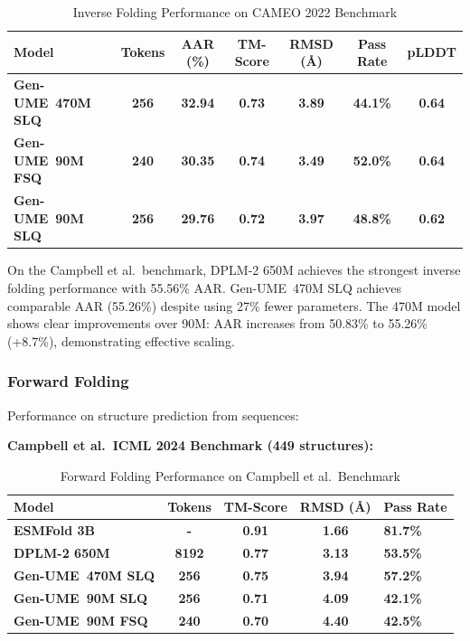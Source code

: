 \documentclass[11pt,a4paper]{article}
\newcommand{\genume}{Gen-UME}
\begin{document}
\begin{table}[h]
\centering
\small
\caption{Inverse Folding Performance on CAMEO 2022 Benchmark}
\begin{tabular}{@{}lcccccc@{}}
\toprule
\textbf{Model} & \textbf{Tokens} & \textbf{AAR (\%)} & \textbf{TM-Score} & \textbf{RMSD (Å)} & \textbf{Pass Rate} & \textbf{pLDDT} \\
\midrule
\textbf{\genume~470M SLQ} & \textbf{256} & \textbf{32.94} & \textbf{0.73} & \textbf{3.89} & \textbf{44.1\%} & \textbf{0.64} \\
\textbf{\genume~90M FSQ} & \textbf{240} & \textbf{30.35} & \textbf{0.74} & \textbf{3.49} & \textbf{52.0\%} & \textbf{0.64} \\
\textbf{\genume~90M SLQ} & \textbf{256} & \textbf{29.76} & \textbf{0.72} & \textbf{3.97} & \textbf{48.8\%} & \textbf{0.62} \\
\bottomrule
\end{tabular}
\label{tab:inverse_folding_cameo}
\end{table}

On the Campbell et al.~benchmark, DPLM-2 650M achieves the strongest inverse folding performance with 55.56\% AAR. \genume~470M SLQ achieves comparable AAR (55.26\%) despite using 27\% fewer parameters. The 470M model shows clear improvements over 90M: AAR increases from 50.83\% to 55.26\% (+8.7\%), demonstrating effective scaling.

\subsubsection{Forward Folding}

Performance on structure prediction from sequences:

\textbf{Campbell et al.~ICML 2024 Benchmark (449 structures):}

\begin{table}[h]
\centering
\small
\caption{Forward Folding Performance on Campbell et al.~Benchmark}
\begin{tabular}{@{}lcccl@{}}
\toprule
\textbf{Model} & \textbf{Tokens} & \textbf{TM-Score} & \textbf{RMSD (Å)} & \textbf{Pass Rate} \\
\midrule
\textbf{ESMFold 3B} \cite{lin2023} & \textbf{-} & \textbf{0.91} & \textbf{1.66} & \textbf{81.7\%} \\
\textbf{DPLM-2 650M} \cite{wang2024} & \textbf{8192} & \textbf{0.77} & \textbf{3.13} & \textbf{53.5\%} \\
\textbf{\genume~470M SLQ} & \textbf{256} & \textbf{0.75} & \textbf{3.94} & \textbf{57.2\%} \\
\textbf{\genume~90M SLQ} & \textbf{256} & \textbf{0.71} & \textbf{4.09} & \textbf{42.1\%} \\
\textbf{\genume~90M FSQ} & \textbf{240} & \textbf{0.70} & \textbf{4.40} & \textbf{42.5\%} \\
\bottomrule
\end{tabular}
\label{tab:forward_folding_campbell}
\end{table}
\end{document}
